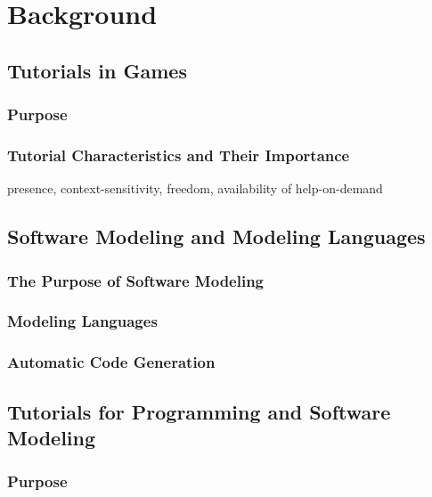 \chapter{Background}
\label{ch:background}


\section{Tutorials in Games}
\label{sec:tutorials_in_games}


\subsection{Purpose}

\subsection{Tutorial Characteristics and Their Importance}

presence, context-sensitivity, freedom, availability of help-on-demand



\section{Software Modeling and Modeling Languages}
\label{sec:software_modeling}

\subsection{The Purpose of Software Modeling}


\subsection{Modeling Languages}


\subsection{Automatic Code Generation}



\section{Tutorials for Programming and Software Modeling}
\label{sec:programming_tutorials}

\subsection{Purpose}


